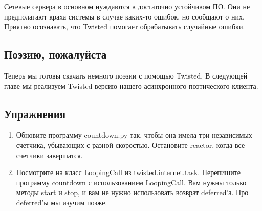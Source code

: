 Сетевые сервера в основном нуждаются в достаточно устойчивом ПО. 
Они не предполагают краха системы в случае каких-то ошибок, но 
сообщают о них. Приятно осознавать, что Twisted помогает обрабатывать 
случайные ошибки.


\subsection{Поэзию, пожалуйста}

Теперь мы готовы скачать немного поэзии с помощью Twisted. 
В следующей главе мы реализуем Twisted версию нашего 
асинхронного поэтического клиента.


\subsection{Упражнения}

\begin{enumerate}
\item Обновите программу countdown.py так, чтобы она имела три независимых 
счетчика, убывающих с разной скоростью. Остановите reactor, когда все 
счетчики завершатся.

\item Посмотрите на класс LoopingCall из
\href{http://twistedmatrix.com/trac/browser/tags/releases/twisted-8.2.0/twisted/internet/task.py}{twisted.internet.task}. 
Перепишите программу countdown с использованием LoopingCall. 
Вам нужны только методы start и 
stop, и вам не нужно использовать возврат deferred'а. 
Про deferred'ы мы изучим позже.
\end{enumerate}



